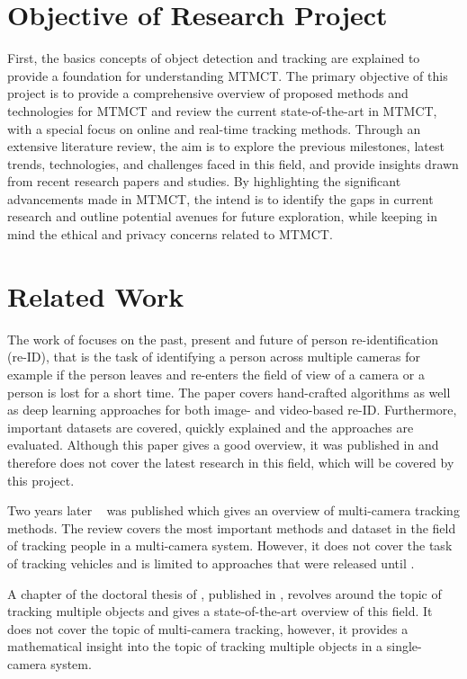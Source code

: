 \section{Objective of Research Project}\label{sec:objective_of_review}
First, the basics concepts of object detection and tracking are explained to provide a foundation for understanding MTMCT. The primary objective of this project is to provide a comprehensive overview of proposed methods and technologies for MTMCT and review the current state-of-the-art in MTMCT, with a special focus on online and real-time tracking methods. Through an extensive literature review, the aim is to explore the previous milestones, latest trends, technologies, and challenges faced in this field, and provide insights drawn from recent research papers and studies. By highlighting the significant advancements made in MTMCT, the intend is to identify the gaps in current research and outline potential avenues for future exploration, while keeping in mind the ethical and privacy concerns related to MTMCT.

\section{Related Work}\label{sec:related_work}
The work of \textcite{Zheng16c} focuses on the past, present and future of person re-identification (re-ID), that is the task of identifying a person across multiple cameras for example if the person leaves and re-enters the field of view of a camera or a person is lost for a short time. The paper covers hand-crafted algorithms as well as deep learning approaches for both image- and video-based re-ID. Furthermore, important datasets are covered, quickly explained and the approaches are evaluated. Although this paper gives a good overview, it was published in \citeyear{Zheng16c} and therefore does not cover the latest research in this field, which will be covered by this project.

Two years later ~\cite{Iguernaissi18} was published which gives an overview of multi-camera tracking methods. The review covers the most important methods and dataset in the field of tracking people in a multi-camera system. However, it does not cover the task of tracking vehicles and is limited to approaches that were released until \citeyear{Iguernaissi18}.

A chapter of the doctoral thesis of \textcite[Chapter 5]{Tian19}, published in \citeyear{Tian19}, revolves around the topic of tracking multiple objects and gives a state-of-the-art overview of this field. It does not cover the topic of multi-camera tracking, however, it provides a mathematical insight into the topic of tracking multiple objects in a single-camera system.

